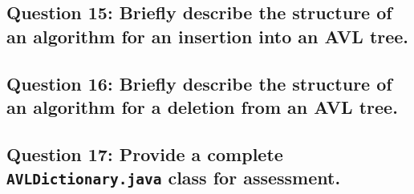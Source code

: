 \documentclass[a4paper, 12pt, titlepage]{article}
\def\code#1{\texttt{#1}}
\begin{document}
\subsection*{Question 15: Briefly describe the structure of an algorithm for an insertion into an AVL tree.} 

\subsection*{Question 16: Briefly describe the structure of an algorithm for a deletion from an AVL tree.} 

\subsection*{Question 17: Provide a complete \code{AVLDictionary.java} class for assessment.} 
\end{document}
